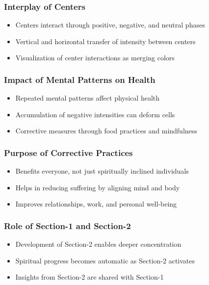\begin{frame}[fragile]\frametitle{Interplay of Centers}
    \begin{itemize}
        \item Centers interact through positive, negative, and neutral phases
        \item Vertical and horizontal transfer of intensity between centers
        \item Visualization of center interactions as merging colors
    \end{itemize}
\end{frame}

\begin{frame}[fragile]\frametitle{Impact of Mental Patterns on Health}
    \begin{itemize}
        \item Repeated mental patterns affect physical health
        \item Accumulation of negative intensities can deform cells
        \item Corrective measures through food practices and mindfulness
    \end{itemize}
\end{frame}

\begin{frame}[fragile]\frametitle{Purpose of Corrective Practices}
    \begin{itemize}
        \item Benefits everyone, not just spiritually inclined individuals
        \item Helps in reducing suffering by aligning mind and body
        \item Improves relationships, work, and personal well-being
    \end{itemize}
\end{frame}

\begin{frame}[fragile]\frametitle{Role of Section-1 and Section-2}
    \begin{itemize}
        \item Development of Section-2 enables deeper concentration
        \item Spiritual progress becomes automatic as Section-2 activates
        \item Insights from Section-2 are shared with Section-1
    \end{itemize}
\end{frame}

